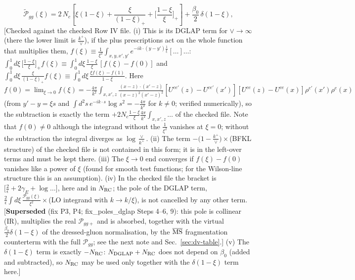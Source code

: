 \documentclass[9pt]{article}
\numberwithin{equation}{section}
\begin{document}
$$\widetilde{\mathcal{P}}_{gg}(\xi) = 2\,N_{c}\left[\xi(1-\xi) + \frac{\xi}{(1-\xi)_{+}} + \Big[\frac{1-\xi}{\xi}\Big]_{+}\right]+\frac{\beta_{0}}{2}\,\delta(1-\xi),$$ {\color{red}[Checked against the checked Row IV file. (i) This is its DGLAP term for $\vee\to\infty$ (there the lower limit is $\frac{k^{+}}{\vee}$), if the plus prescriptions act on the whole function that multiplies them, $f(\xi)\equiv\frac{1}{\xi^{2}}\int_{x,y,x',y'}e^{-ik\cdot(y-y')\frac{1}{\xi}}[\dots]\dots$: $\int_{0}^{1}d\xi\,\big[\frac{1-\xi}{\xi}\big]_{+}f(\xi)\equiv\int_{0}^{1}d\xi\,\frac{1-\xi}{\xi}\,[f(\xi)-f(0)]$ and $\int_{0}^{1}d\xi\,\frac{\xi}{(1-\xi)_{+}}f(\xi)\equiv\int_{0}^{1}d\xi\,\frac{\xi f(\xi)-f(1)}{1-\xi}$. Here $f(0)=\lim_{\xi\to0}f(\xi)=-\frac{4\pi}{k^{2}}\int_{x,x',z}\frac{(x-z)\cdot(x'-z)}{(x-z)^{2}(x'-z)^{2}}[U^{ce'}(z)-U^{ce'}(x')][U^{ce}(z)-U^{ce}(x)]\rho^{e'}(x')\rho^{e}(x)$ (from $y'-y=\xi s$ and $\int d^{2}s\,e^{-ik\cdot s}\log s^{2}=-\frac{4\pi}{k^{2}}$ for $k\neq0$; verified numerically), so the subtraction is exactly the term $+2N_{c}\frac{1-\xi}{\xi}\frac{4\pi}{k^{2}}\int_{x,x',z}\dots$ of the checked file. Note that $f(0)\neq0$ although the integrand without the $\frac{1}{\xi^{2}}$ vanishes at $\xi=0$; without the subtraction the integral diverges as $\log\frac{\vee}{k^{+}}$. (ii) The term $-\big(1-\frac{k^{+}}{\vee}\big)\times$(BFKL structure) of the checked file is not contained in this form; it is in the left-over terms and must be kept there. (iii) The $\xi\to0$ end converges if $f(\xi)-f(0)$ vanishes like a power of $\xi$ (found for smooth test functions; for the Wilson-line structure this is an assumption). (iv) In the checked file the bracket is $\big[\frac{2}{\epsilon}+2\gamma_{E}+\log\dots\big]$, here and in $N_{\rm RC}$; the pole of the DGLAP term, $\frac{2}{\epsilon}\int d\xi\,\frac{\mathcal P_{gg}(\xi)}{\xi^{2}}\times$(LO integrand with $k\to k/\xi$), {\color{teal}is not cancelled by any other term.} {\color{red}[\textbf{Superseded} (fix P3, P4; fix\_poles\_dglap Steps 4--6, 9): this pole is collinear (IR), multiplies the real $\mathcal{P}_{gg+}$ and is absorbed, together with the virtual $\frac{\beta_{0}}{2}\delta(1-\xi)$ of the dressed-gluon normalisation, by the $\overline{\rm MS}$ fragmentation counterterm with the full $\mathcal{P}_{gg}$; see the next note and Sec.~\ref{sec:dv-table}.]} (v) The $\delta(1-\xi)$ term is exactly $-N_{\rm RC}$: $N_{\rm DGLAP}+N_{\rm RC}$ does not depend on $\beta_{0}$ (added and subtracted), so $N_{\rm RC}$ may be used only together with the $\delta(1-\xi)$ term here.]}\par\noindent
\end{document}
